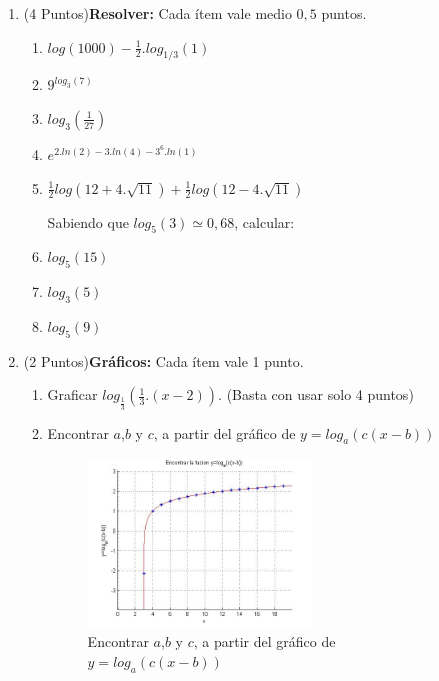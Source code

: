 \documentclass[a4paper]{exam}
\begin{document}
\begin{enumerate}
\item (4 Puntos)\textbf{Resolver:} Cada ítem vale medio $0,5$ puntos.
\begin{multicols}{2}
\begin{enumerate}
\item $log(1000)-\frac{1}{2}.log_{1/3}(1)$
\item $9^{log_3(7)}$
\item $log_3(\frac{1}{27})$
\item $e^{2.ln(2) - 3.ln(4) - 3^{6}.ln(1)}$

\columnbreak

\item $\frac{1}{2}log(12+4.\sqrt{11})+\frac{1}{2}log(12-4.\sqrt{11})$

Sabiendo que $log_5(3)\simeq 0,68$, calcular:

\item $log_5(15)$
\item $log_3(5)$
\item $log_5(9)$


\end{enumerate}
\end{multicols}

\item (2 Puntos)\textbf{Gráficos:}
Cada ítem vale 1 punto.
\begin{enumerate}
\item Graficar $log_{\frac{1}{3}}(\frac{1}{3}.(x-2))$. (Basta con usar solo 4 puntos)

\item Encontrar $a$,$b$ y $c$,  a partir del gráfico de $y=log_a(c(x-b))$

\begin{figure}[h!]
\centering
\includegraphics[width=0.6\textwidth]{logsencontrar1.jpg}
\caption{Encontrar $a$,$b$ y $c$,  a partir del gráfico de $y=log_a(c(x-b))$}
\label{fig:logaritmo}
\end{figure}


\end{enumerate}
\end{enumerate}
\end{document}
